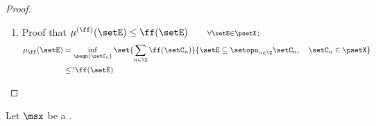 {\begin{proof}
\begin{enumerate}
\begin{enumerate}
    \item monoticity:
      \begin{align*}
        \mu_\ff(\setE)
          &= \inf_{\seqn{\setC_n}}\set{\sum_{n\in\Z} \ff(\setC_n)}{\setE\subseteq \setopu_{n\in\Z}\setC_n,\quad\setC_n\in\psetX}
        \\&\le \inf_{\seqn{\setC_n}}\set{\sum_{n\in\Z} \ff(\setC_n)}{\setF\subseteq \setopu_{n\in\Z}\setC_n,\quad\setC_n\in\psetX}
          &&   \text{by $\setE\subseteq\setF$ hypothesis}
        \\&=   \mu_\ff(\setF)
      \end{align*}

  \end{enumerate}
  
  \item Proof that 
        $\mu^{(\ff)}(\setE) \le \ff(\setE) \qquad \scriptstyle \forall\setE\in\psetX$:
      \begin{align*}
        \mu_\ff(\setE)
          &= \inf_{\seqn{\setC_n}}\set{\sum_{n\in\Z} \ff(\setC_n)}{\setE\subseteq \setopu_{n\in\Z}\setC_n,\quad\setC_n\in\psetX}
        \\&\le? \ff(\setE)
      \end{align*}
\problem
\end{enumerate}
\end{proof}

\begin{proposition}
\label{prop:mom}
Let $\msx$ be a .
\end{proposition}




} %



